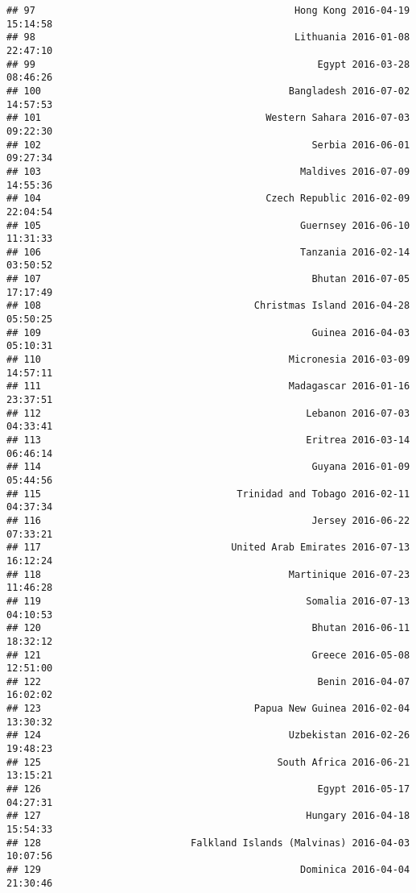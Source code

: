 \documentclass[
]{article}
\begin{document}
\begin{verbatim}
## 97                                             Hong Kong 2016-04-19 15:14:58
## 98                                             Lithuania 2016-01-08 22:47:10
## 99                                                 Egypt 2016-03-28 08:46:26
## 100                                           Bangladesh 2016-07-02 14:57:53
## 101                                       Western Sahara 2016-07-03 09:22:30
## 102                                               Serbia 2016-06-01 09:27:34
## 103                                             Maldives 2016-07-09 14:55:36
## 104                                       Czech Republic 2016-02-09 22:04:54
## 105                                             Guernsey 2016-06-10 11:31:33
## 106                                             Tanzania 2016-02-14 03:50:52
## 107                                               Bhutan 2016-07-05 17:17:49
## 108                                     Christmas Island 2016-04-28 05:50:25
## 109                                               Guinea 2016-04-03 05:10:31
## 110                                           Micronesia 2016-03-09 14:57:11
## 111                                           Madagascar 2016-01-16 23:37:51
## 112                                              Lebanon 2016-07-03 04:33:41
## 113                                              Eritrea 2016-03-14 06:46:14
## 114                                               Guyana 2016-01-09 05:44:56
## 115                                  Trinidad and Tobago 2016-02-11 04:37:34
## 116                                               Jersey 2016-06-22 07:33:21
## 117                                 United Arab Emirates 2016-07-13 16:12:24
## 118                                           Martinique 2016-07-23 11:46:28
## 119                                              Somalia 2016-07-13 04:10:53
## 120                                               Bhutan 2016-06-11 18:32:12
## 121                                               Greece 2016-05-08 12:51:00
## 122                                                Benin 2016-04-07 16:02:02
## 123                                     Papua New Guinea 2016-02-04 13:30:32
## 124                                           Uzbekistan 2016-02-26 19:48:23
## 125                                         South Africa 2016-06-21 13:15:21
## 126                                                Egypt 2016-05-17 04:27:31
## 127                                              Hungary 2016-04-18 15:54:33
## 128                          Falkland Islands (Malvinas) 2016-04-03 10:07:56
## 129                                             Dominica 2016-04-04 21:30:46

\end{verbatim}
\end{document}
